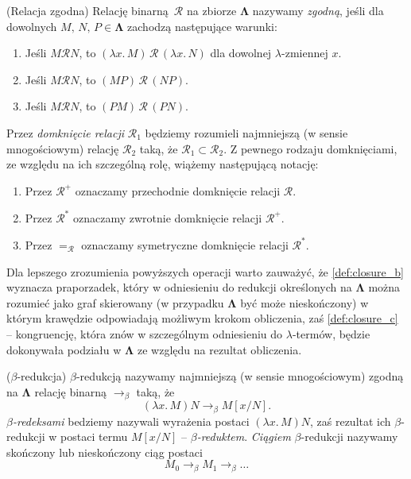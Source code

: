 \begin{definicja}(Relacja zgodna)
  Relację binarną \(\mathcal{R}\) na zbiorze \(\mathbf{\Lambda}\) nazywamy \emph{zgodną}, jeśli dla dowolnych \(M,\,N,\,P \in \mathbf{\Lambda}\) zachodzą następujące warunki:
  \begin{enumerate}[label={(c\arabic*)}, ref={(\arabic*)}]
    \setlength\itemsep{0em}
    \item Jeśli \(M \mathcal{R} N\), to \((\lambda x.\,M)\,\mathcal{R}\,(\lambda x.\,N)\) dla dowolnej \(\lambda\)-zmiennej \(x\).
    \item Jeśli \(M \mathcal{R} N\), to \((MP)\,\mathcal{R}\,(NP)\).
    \item Jeśli \(M \mathcal{R} N\), to \((PM)\,\mathcal{R}\,(PN)\).
  \end{enumerate}
\end{definicja}
Przez \emph{domknięcie relacji} \(\mathcal{R}_1\) będziemy rozumieli najmniejszą (w sensie mnogościowym) relację \(\mathcal{R}_2\) taką, że \(\mathcal{R}_1\subset\mathcal{R}_2\).
  Z pewnego rodzaju domknięciami, ze względu na ich szczególną rolę, wiążemy następującą notację:
  \begin{enumerate}[label=(\alph*), ref={(\alph*)}]
    \setlength\itemsep{0em}
    \item Przez \(\mathcal{R}^{+}\) oznaczamy przechodnie domknięcie relacji \(\mathcal{R}\).\label{def:closure_a}
    \item Przez \(\mathcal{R}^{*}\) oznaczamy zwrotnie domknięcie relacji \(\mathcal{R}^{+}\).\label{def:closure_b}
    \item Przez \(=_{\mathcal{R}}\) oznaczamy symetryczne domknięcie relacji \(\mathcal{R}^{*}\).\label{def:closure_c}
\end{enumerate}
Dla lepszego zrozumienia powyższych operacji warto zauważyć, że \ref{def:closure_b} wyznacza praporzadek, który w odniesieniu do redukcji określonych na \(\mathbf{\Lambda}\) można rozumieć jako graf skierowany (w przypadku \(\mathbf{\Lambda}\) być może nieskończony) w którym krawędzie odpowiadają możliwym krokom obliczenia, zaś \ref{def:closure_c} -- kongruencję, która znów w szczególnym odniesieniu do \(\lambda\)-termów, będzie dokonywała podziału w \(\mathbf{\Lambda}\) ze względu na rezultat obliczenia.
\begin{definicja}(\(\beta\)-redukcja)
  \(\beta\)-redukcją nazywamy najmniejszą (w sensie mnogościowym) zgodną na \(\mathbf{\Lambda}\) relację binarną \(\to_\beta\) taką, że
  \[
    (\lambda x.\,M)N\rightarrow_\beta M[x/N].
  \]
\emph{\(\beta\)-redeksami} bedziemy nazywali wyrażenia postaci \((\lambda x.\, M)N\), zaś rezultat ich \(\beta\)-redukcji w postaci termu \(M[x/N]\) -- \emph{\(\beta\)-reduktem}. \emph{Ciągiem} \(\beta\)-redukcji nazywamy skończony lub nieskończony ciąg postaci
  \[
    M_0 \to_\beta M_1 \to_\beta \dots 
  \]
\end{definicja}
